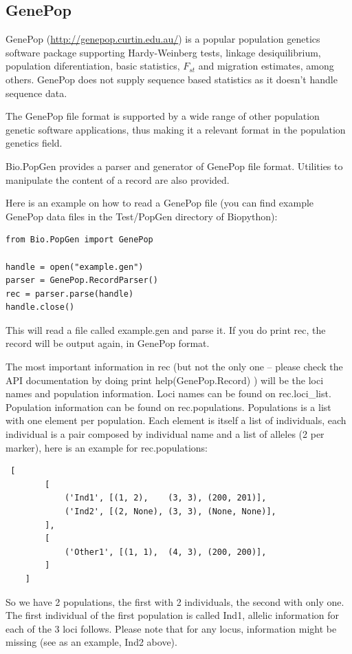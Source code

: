 \documentclass{report}
\begin{document}
\subsection{GenePop}

GenePop (\url{http://genepop.curtin.edu.au/}) is a popular population
genetics software package supporting Hardy-Weinberg tests, linkage
desiquilibrium, population diferentiation, basic statistics, $F_{st}$ and
migration estimates, among others. GenePop does not supply sequence
based statistics as it doesn't handle sequence data.

The GenePop file format is supported by a wide range of other population
genetic software applications, thus making it a relevant format in the
population genetics field.

Bio.PopGen provides a parser and generator of GenePop file format.
Utilities to manipulate the content of a record are also provided.

Here is an example on how to read a GenePop file (you can find
example GenePop data files in the Test/PopGen directory of Biopython):

\begin{verbatim}
from Bio.PopGen import GenePop

handle = open("example.gen")
parser = GenePop.RecordParser()
rec = parser.parse(handle)
handle.close()
\end{verbatim}

This will read a file called example.gen and parse it. If you
do print rec, the record will be output again, in GenePop format.

The most important information in rec (but not the only one -- please
check the API documentation by doing print help(GenePop.Record) )
will be the loci names and
population information. Loci names can be found on rec.loci\_list.
Population information can be found on rec.populations.
Populations is a list with one element per population. Each element is itself
a list of individuals, each individual is a pair composed by individual
name and a list of alleles (2 per marker), here is an example for
rec.populations:

\begin{verbatim}
 [
        [
            ('Ind1', [(1, 2),    (3, 3), (200, 201)],
            ('Ind2', [(2, None), (3, 3), (None, None)],
        ],
        [
            ('Other1', [(1, 1),  (4, 3), (200, 200)],
        ]
    ]
\end{verbatim}

So we have 2 populations, the first with 2 individuals, the
second with only one. The first individual of the first
population is called Ind1, allelic information for each of
the 3 loci follows. Please note that for any locus, information
might be missing (see as an example, Ind2 above).
\end{document}
